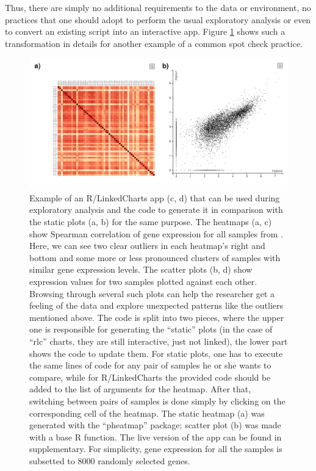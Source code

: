 \documentclass[twocolumn,10pt]{article}
\begin{document}
Thus, there are simply no additional requirements to the data or environment, no practices that one should adopt to perform the usual exploratory analysis or even to convert an existing script into an interactive app. Figure \ref{FigE} shows such a transformation in details for another example of a common spot check practice.

\begin{figure}[t]
  \includegraphics[width=\textwidth]{FigE/figE.png}
  \caption{ Example of an R/LinkedCharts app (c, d) that can be used during exploratory analysis and the code to generate it in comparison with the static plots (a, b) for the same purpose. The heatmaps (a, c) show Spearman correlation of gene expression for all samples from \citet{conway_2015}. Here, we can see two clear outliers in each heatmap's right and bottom and some more or less pronounced clusters of samples with similar gene expression levels. The scatter plots (b, d) show expression values for two samples plotted against each other. Browsing through several such plots can help the researcher get a feeling of the data and explore unexpected patterns like the outliers mentioned above. The code is split into two pieces, where the upper one is responsible for generating the ``static'' plots (in the case of ``rlc'' charts, they are still interactive, just not linked), the lower part shows the code to update them. For static plots, one has to execute the same lines of code for any pair of samples he or she wants to compare, while for R/LinkedCharts the provided code should be added to the list of arguments for the heatmap. After that, switching between pairs of samples is done simply by clicking on the corresponding cell of the heatmap. The static heatmap (a) was generated with the ``pheatmap'' package; scatter plot (b) was made with a base R function. The live version of the app can be found in supplementary. For simplicity, gene expression for all the samples is subsetted to 8000 randomly selected genes.}
  \label{FigE}
\end{figure}
\end{document}
